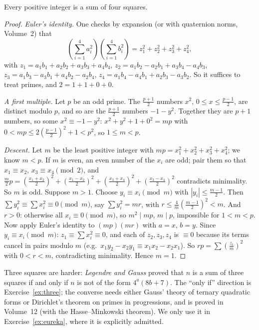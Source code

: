 \begin{theorem}[Lagrange, 1770]\label{thm:foursq}
Every positive integer is a sum of four squares.
\end{theorem}
\begin{proof}
\emph{Euler's identity.} One checks by expansion (or with quaternion norms, Volume~2) that
\[
\left(\sum_{i=1}^4a_i^2\right)\left(\sum_{i=1}^4b_i^2\right)=z_1^2+z_2^2+z_3^2+z_4^2,
\]
with $z_1=a_1b_1+a_2b_2+a_3b_3+a_4b_4$, $z_2=a_1b_2-a_2b_1+a_3b_4-a_4b_3$, $z_3=a_1b_3-a_3b_1+a_4b_2-a_2b_4$, $z_4=a_1b_4-a_4b_1+a_2b_3-a_3b_2$. So it suffices to treat primes, and $2=1+1+0+0$.

\emph{A first multiple.} Let $p$ be an odd prime. The $\frac{p+1}2$ numbers $x^2$, $0\le x\le\frac{p-1}2$, are distinct modulo $p$, and so are the $\frac{p+1}2$ numbers $-1-y^2$. Together they are $p+1$ numbers, so some $x^2\equiv-1-y^2$: $x^2+y^2+1+0^2=mp$ with $0<mp\le2\left(\frac{p-1}2\right)^2+1<p^2$, so $1\le m<p$.

\emph{Descent.} Let $m$ be the least positive integer with $mp=x_1^2+x_2^2+x_3^2+x_4^2$; we know $m<p$. If $m$ is even, an even number of the $x_i$ are odd; pair them so that $x_1\equiv x_2$, $x_3\equiv x_4\pmod2$, and $\frac m2p=\left(\frac{x_1+x_2}2\right)^2+\left(\frac{x_1-x_2}2\right)^2+\left(\frac{x_3+x_4}2\right)^2+\left(\frac{x_3-x_4}2\right)^2$ contradicts minimality. So $m$ is odd. Suppose $m>1$. Choose $y_i\equiv x_i\pmod m$ with $|y_i|\le\frac{m-1}2$. Then $\sum y_i^2\equiv\sum x_i^2\equiv0\pmod m$, say $\sum y_i^2=mr$, with $r\le\frac{4}{m}\left(\frac{m-1}2\right)^2<m$. And $r>0$: otherwise all $x_i\equiv0\pmod m$, so $m^2\mid mp$, $m\mid p$, impossible for $1<m<p$.
Now apply Euler's identity to $(mp)(mr)$ with $a=x$, $b=y$. Since $y_i\equiv x_i\pmod m$: $z_1\equiv\sum x_i^2\equiv0$, and each of $z_2,z_3,z_4$ is $\equiv0$ because its terms cancel in pairs modulo $m$ (e.g.\ $x_1y_2-x_2y_1\equiv x_1x_2-x_2x_1$). So $rp=\sum\left(\frac{z_i}m\right)^2$ with $0<r<m$, contradicting minimality. Hence $m=1$.
\end{proof}

\begin{remark}
Three squares are harder: \emph{Legendre and Gauss} proved that $n$ is a sum of three squares if and only if $n$ is not of the form $4^a(8b+7)$. The ``only if'' direction is Exercise~\ref{ex:three}; the converse needs either Gauss' theory of ternary quadratic forms or Dirichlet's theorem on primes in progressions, and is proved in Volume~12 (with the Hasse--Minkowski theorem). We only use it in Exercise~\ref{ex:eureka}, where it is explicitly admitted.
\end{remark}

